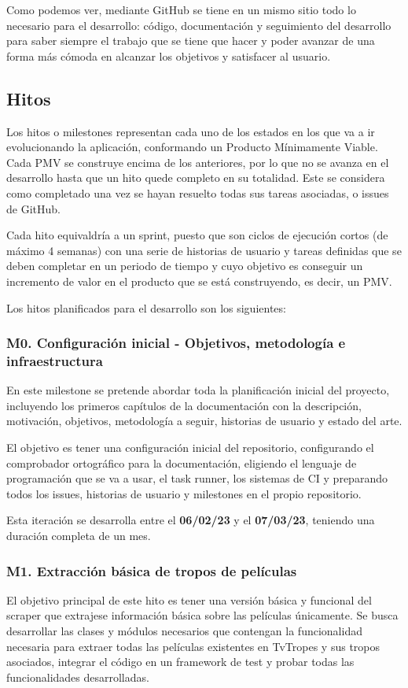 Como podemos ver, mediante GitHub se tiene en un mismo sitio todo lo necesario para el desarrollo: código, documentación y seguimiento del desarrollo para saber siempre el trabajo que se tiene que hacer y poder avanzar de una forma más cómoda en alcanzar los objetivos y satisfacer al usuario.

\subsection{Hitos}
Los hitos o milestones representan cada uno de los estados en los que va a ir evolucionando la aplicación, conformando un Producto Mínimamente Viable. Cada PMV se construye encima de los anteriores, por lo que no se avanza en el desarrollo hasta que un hito quede completo en su totalidad. Este se considera como completado una vez se hayan resuelto todas sus tareas asociadas, o issues de GitHub. 

Cada hito equivaldría a un sprint, puesto que son ciclos de ejecución cortos (de máximo 4 semanas) con una serie de historias de usuario y tareas definidas que se deben completar en un periodo de tiempo y cuyo objetivo es conseguir un incremento de valor en el producto que se está construyendo, es decir, un PMV.

Los hitos planificados para el desarrollo son los siguientes:

\subsubsection{M0. Configuración inicial - Objetivos, metodología e infraestructura}
En este milestone se pretende abordar toda la planificación inicial del proyecto, incluyendo los primeros capítulos de la documentación con la descripción, motivación, objetivos, metodología a seguir, historias de usuario y estado del arte.

El objetivo es tener una configuración inicial del repositorio, configurando el comprobador ortográfico para la documentación, eligiendo el lenguaje de programación que se va a usar, el task runner, los sistemas de CI y preparando todos los issues, historias de usuario y milestones en el propio repositorio.

Esta iteración se desarrolla entre el \textbf{06/02/23} y el \textbf{07/03/23}, teniendo una duración completa de un mes.
\subsubsection{M1. Extracción básica de tropos de películas}
El objetivo principal de este hito es tener una versión básica y funcional del scraper que extrajese información básica sobre las películas únicamente. Se busca desarrollar las clases y módulos necesarios que contengan la funcionalidad necesaria para extraer todas las películas existentes en TvTropes y sus tropos asociados, integrar el código en un framework de test y probar todas las funcionalidades desarrolladas.

